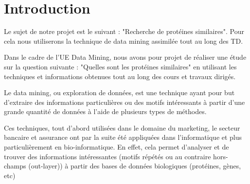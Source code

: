 \section*{Introduction}


\setcounter{page}{2}

Le sujet de notre projet est le suivant : "Recherche de protéines similaires". Pour cela nous utiliserons la technique de data mining assimilée tout au long des TD.

Dans le cadre de l'UE Data Mining, nous avons pour projet de réaliser une étude sur la question suivante : "Quelles sont les protéines similaires" en utilisant les techniques et informations obtenues tout au long des cours et travaux dirigés.

Le data mining, ou exploration de données, est une technique ayant pour but d'extraire des informations particulières ou des motifs intéressants à partir d'une grande quantité de données à l'aide de plusieurs types de méthodes.

Ces techniques, tout d'abord utilisées dans le domaine du marketing, le secteur bancaire et assurance ont par la suite été appliquées dans l'informatique et plus particulièrement en bio-informatique. En effet, cela permet d'analyser et de trouver des informations intéressantes (motifs répétés ou au contraire hors-champs (out-layer)) à partir des bases de données biologiques (protéines, gènes, etc)

